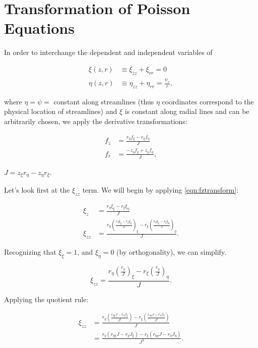 \section{Transformation of Poisson Equations}
\label{app:poissontransform}

In order to interchange the dependent and independent variables of

\begin{subequations}
	\begin{align}
		\xi(z,r) &\equiv \xi_{zz} + \xi_{rr} = 0\\
		\label{eqn:nzr}
		\eta(z,r) &\equiv \eta_{zz} + \eta_{rr} = \frac{\psi_r}{r},
	\end{align}
\end{subequations}

\noindent where \(\eta = \psi =\) constant along streamlines (thus \(\eta\) coordinates correspond to the physical location of streamlines) and \(\xi\) is constant along radial lines and can be arbitrarily chosen,
we apply the derivative transformations:

\begin{subequations}
	\begin{align}
		\label{eqn:fztransform}
		f_z &= \frac{r_\eta f_\xi - r_\xi f_\eta}{J} \\
		\label{eqn:fytransform}
		f_r &= \frac{- z_\eta f_\xi + z_\xi f_\eta}{J},
	\end{align}
\end{subequations}

\where \(J = z_\xi r_\eta - z_\eta r_\xi\).

Let's look first at the \(\xi_{zz}\) term.
%
We will begin by applying \cref{eqn:fztransform}:

\begin{align}
	\xi_z &= \frac{r_\eta \xi_\xi - r_\xi \xi_\eta}{J} \\
	\xi_{zz} &= \frac{r_\eta \left(\frac{r_\eta \xi_\xi - r_\xi \xi_\eta}{J}\right)_\xi - r_\xi \left(\frac{r_\eta \xi_\xi - r_\xi \xi_\eta}{J}\right)_\eta}{J}.
\end{align}

\noindent Recognizing that \(\xi_\xi = 1\), and \(\xi_\eta = 0\) (by orthogonality), we can simplify.

\[
\xi_{zz} = \frac{r_\eta \left(\frac{r_\eta }{J}\right)_\xi - r_\xi \left(\frac{r_\eta}{J}\right)_\eta}{J}.
\]

\noindent Applying the quotient rule:

\[
\begin{aligned}
	\xi_{zz} &= \frac{r_\eta \left(\frac{r_{\eta\xi} J - r_\eta J_\xi}{J^2}\right) - r_\xi \left(\frac{r_{\eta\eta}J - r_\eta J_\eta}{J^2}\right)}{J} \\
	&=  \frac{r_\eta \left(r_{\eta\xi} J - r_\eta J_\xi\right) - r_\xi \left(r_{\eta\eta}J - r_\eta J_\eta\right)}{J^3}.
\end{aligned}
\]

